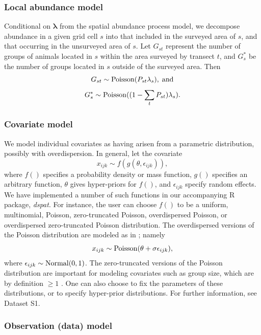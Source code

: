 \documentclass[10pt]{article}
\begin{document}
\subsubsection*{Local abundance model}
Conditional on $\boldsymbol{\lambda}$ from the spatial abundance process model, we decompose abundance in a given grid cell $s$ into that included in the surveyed area of $s$, and that occurring in the unsurveyed area of $s$.  Let $G_{st}$ represent the number of groups of animals located in $s$ within the area surveyed by transect $t$, and $G_s^*$ be the number of groups located in $s$ outside of the surveyed area.  Then
$$
  G_{st} \sim {\rm Poisson}(P_{st} \lambda_s), \hspace{1mm} {\rm and}
$$
$$
  G_s^* \sim {\rm Poisson}((1-\sum_t P_{st}) \lambda_s).
$$

\subsubsection*{Covariate model}

We model individual covariates as having arisen from a parametric distribution, possibly with overdispersion.  In general, let the covariate
\begin{equation} \label{eq:cov.dist}
x_{ijk} \sim f(g(\theta,\epsilon_{ijk})),
\end{equation}
where $f()$ specifies a probability density or mass function, $g()$ specifies an arbitrary function, $\theta$ gives hyper-priors for $f()$, and $\epsilon_{ijk}$ specify random effects.  We have implemented a number of such functions in our accompanying R package, \emph{dspat}.  For instance, the user can choose $f()$ to be a uniform, multinomial, Poisson, zero-truncated Poisson, overdispersed Poisson, or overdispersed zero-truncated Poisson distribution.  The overdispersed versions of the Poisson distribution are modeled as in \cite{McClintockEtAl2009}; namely
$$
x_{ijk} \sim {\rm Poisson}(\theta+\sigma \epsilon_{ijk}),
$$
where $\epsilon_{ijk} \sim {\rm Normal}(0,1)$.
The zero-truncated versions of the Poisson distribution are important for modeling covariates such as group size, which are by definition $\ge 1$ \cite{Royle2008}.
One can also choose to fix the parameters of these distributions, or to specify hyper-prior distributions.  For further information, see Dataset S1.

\subsubsection*{Observation (data) model}
\end{document}
